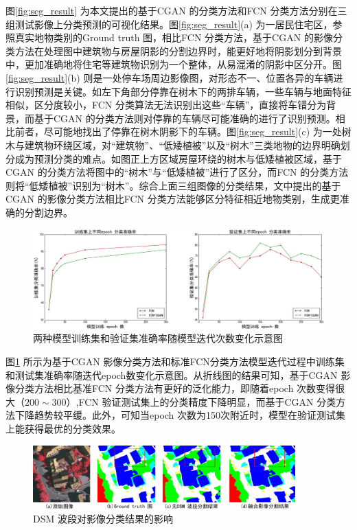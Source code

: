 图\ref{fig:seg_result} 为本文提出的基于CGAN 的分类方法和FCN 分类方法分别在三组测试影像上分类预测的可视化结果。图\ref{fig:seg_result}(a) 为一居民住宅区，参照真实地物类别的Ground truth 图，相比FCN 分类方法，基于CGAN 的影像分类方法在处理图中建筑物与房屋阴影的分割边界时，能更好地将阴影划分到背景中，更加准确地将住宅等建筑物识别为一个整体，从易混淆的阴影中区分开。图\ref{fig:seg_result}(b) 则是一处停车场周边影像图，对形态不一、位置各异的车辆进行识别预测是关键。如左下角部分停靠在树木下的两排车辆，一些车辆与地面特征相似，区分度较小，FCN 分类算法无法识别出这些“车辆”，直接将车错分为背景，而基于CGAN 的分类方法则对停靠的车辆尽可能准确的进行了识别预测。相比前者，尽可能地找出了停靠在树木阴影下的车辆。图\ref{fig:seg_result}(c) 为一处树木与建筑物环绕区域，对“建筑物”、“低矮植被”以及“树木”三类地物的边界明确划分成为预测分类的难点。如图正上方区域房屋环绕的树木与低矮植被区域，基于CGAN 的分类方法将图中的“树木”与“低矮植被”进行了区分，而FCN 的分类方法则将“低矮植被”识别为“树木”。综合上面三组图像的分类结果，文中提出的基于CGAN 的影像分类方法相比FCN 分类方法能够区分特征相近地物类别，生成更准确的分割边界。


\begin{figure}[!htb]
  \centering
  \includegraphics[width=\textwidth]{figures/epoch_acc}
  \caption{两种模型训练集和验证集准确率随模型迭代次数变化示意图}\label{fig:epoch_acc}
\end{figure}

图\ref{fig:epoch_acc} 所示为基于CGAN 影像分类方法和标准FCN分类方法模型迭代过程中训练集和测试集准确率随迭代epoch数变化示意图。从折线图的结果可知，基于CGAN 影像分类方法相比基准FCN 分类方法有更好的泛化能力，即随着epoch 次数变得很大（$200\sim 300$）,FCN 验证测试集上的分类精度下降明显，而基于CGAN 分类方法下降趋势较平缓。此外，可知当epoch 次数为150次附近时，模型在验证测试集上能获得最优的分类效果。

\begin{figure}[!htb]
  \centering
  \includegraphics[width=0.9\textwidth]{figures/dsm_affect}
  \caption{DSM 波段对影像分类结果的影响}\label{fig:dsm_affect}
\end{figure}

